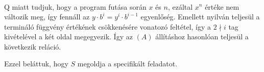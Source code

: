 \documentclass[a4paper,12pt]{article}
\begin{document}
\begin{solution}
\begin{enumerate}
\begin{enumerate}
\begin{enumerate}
\begin{enumerate}
\begin{align*}
						\end{align*}
						Q miatt tudjuk, hogy a program futása során $x$ és $n$, ezáltal $x^n$ értéke nem változik meg, így fennáll az $ y \cdot b^i =  y^i \cdot b^{i-1} $ egyenlőség. Emellett nyilván teljesül a termináló függvény értékének csökkenésére vonatozó feltétel, így a $ 2 \nmid i $ tag kivételével a két oldal megegyezik. Így az $(A)$ állításhoz hasonlóan teljesül a következik reláció. \checkmark
					\end{enumerate}
				\end{enumerate}
			\end{enumerate}
		\end{enumerate}
		Ezzel beláttuk, hogy $S$ megoldja a specifikált feladatot.
	\end{solution}
\end{document}

